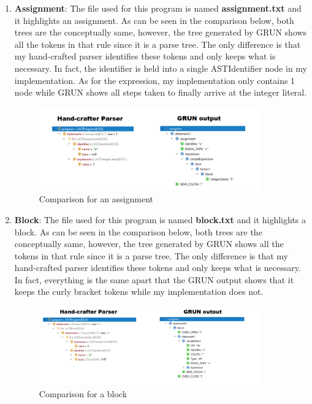 \documentclass{article}
\begin{document}
\begin{enumerate}
					\item \textbf{Assignment}: The file used for this program is named \textbf{assignment.txt} and it highlights an assignment. As can be seen in the comparison below, both trees are the conceptually same, however, the tree generated by GRUN shows all the tokens in that rule since it is a parse tree. The only difference is that my hand-crafted parser identifies these tokens and only keeps what is necessary.  In fact, the identifier is held into a single ASTIdentifier node in my implementation. As for the expression, my implementation only contains 1 node while GRUN shows all steps taken to finally arrive at the integer literal.
						\begin{figure}[H]
					\centering
			 			\includegraphics[width=0.9\textwidth]{compareassignment.png}
			  			\caption{Comparison for an assignment}
			  			\label{fig:compareassignment}
					\end{figure}
					
					\item \textbf{Block}: The file used for this program is named \textbf{block.txt} and it highlights a block. As can be seen in the comparison below, both trees are the conceptually same, however, the tree generated by GRUN shows all the tokens in that rule since it is a parse tree. The only difference is that my hand-crafted parser identifies these tokens and only keeps what is necessary.  In fact, everything is the same apart that the GRUN output shows that it keeps the curly bracket tokens while my implementation does not.
						\begin{figure}[H]
					\centering
			 			\includegraphics[width=0.9\textwidth]{compareblock.png}
			  			\caption{Comparison for a block}
			  			\label{fig:compareblock}
					\end{figure}
					

\end{enumerate}
\end{document}
